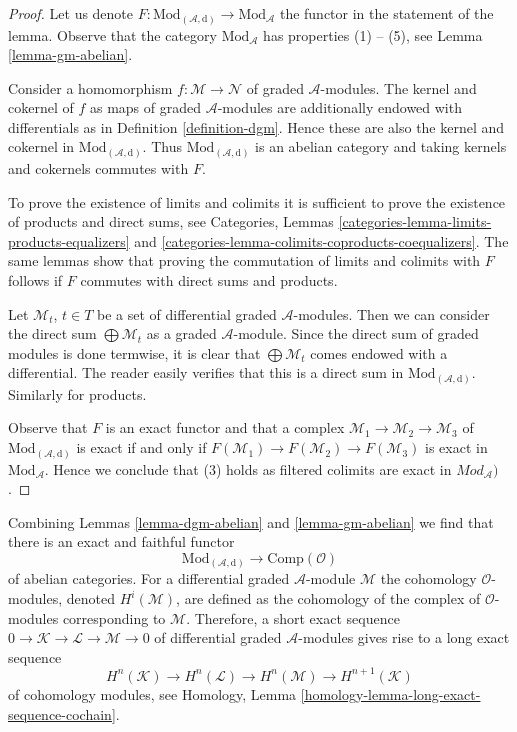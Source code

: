 \begin{proof}
Let us denote
$F : \text{Mod}_{(\mathcal{A}, \text{d})} \to \text{Mod}_\mathcal{A}$
the functor in the statement of the lemma. Observe that
the category $\text{Mod}_\mathcal{A}$ has properties (1) -- (5), see
Lemma \ref{lemma-gm-abelian}.

\medskip\noindent
Consider a homomorphism $f : \mathcal{M} \to \mathcal{N}$
of graded $\mathcal{A}$-modules. The kernel
and cokernel of $f$ as maps of graded $\mathcal{A}$-modules
are additionally endowed with differentials as in
Definition \ref{definition-dgm}. Hence these are also
the kernel and cokernel in $\text{Mod}_{(\mathcal{A}, \text{d})}$.
Thus $\text{Mod}_{(\mathcal{A}, \text{d})}$ is an abelian category
and taking kernels and cokernels commutes with $F$.

\medskip\noindent
To prove the existence of limits and colimits it is sufficient
to prove the existence of products and direct sums, see
Categories, Lemmas \ref{categories-lemma-limits-products-equalizers} and
\ref{categories-lemma-colimits-coproducts-coequalizers}.
The same lemmas show that
proving the commutation of limits and colimits with $F$
follows if $F$ commutes with direct sums and products.

\medskip\noindent
Let $\mathcal{M}_t$, $t \in T$ be a set of differential
graded $\mathcal{A}$-modules. Then we can consider the direct
sum $\bigoplus \mathcal{M}_t$ as a graded $\mathcal{A}$-module.
Since the direct sum of graded modules is done termwise, it is
clear that $\bigoplus \mathcal{M}_t$ comes endowed with a differential.
The reader easily verifies that this is a direct sum in
$\text{Mod}_{(\mathcal{A}, \text{d})}$. Similarly for products.

\medskip\noindent
Observe that $F$ is an exact functor and that
a complex $\mathcal{M}_1 \to \mathcal{M}_2 \to \mathcal{M}_3$
of $\text{Mod}_{(\mathcal{A}, \text{d})}$ is exact if and only if
$F(\mathcal{M}_1) \to F(\mathcal{M}_2) \to F(\mathcal{M}_3)$
is exact in $\text{Mod}_\mathcal{A}$. Hence we conclude that (3)
holds as filtered colimits are exact in
$\textit{Mod}_\mathcal{A})$.
\end{proof}

\noindent
Combining Lemmas \ref{lemma-dgm-abelian} and \ref{lemma-gm-abelian}
we find that there is an exact and faithful functor
$$
\text{Mod}_{(\mathcal{A}, \text{d})} \longrightarrow \text{Comp}(\mathcal{O})
$$
of abelian categories. For a differential graded $\mathcal{A}$-module
$\mathcal{M}$ the cohomology $\mathcal{O}$-modules, denoted $H^i(\mathcal{M})$,
are defined as the cohomology of the complex of
$\mathcal{O}$-modules corresponding to $\mathcal{M}$.
Therefore, a short exact sequence 
$0 \to \mathcal{K} \to \mathcal{L} \to \mathcal{M} \to 0$
of differential graded $\mathcal{A}$-modules
gives rise to a long exact sequence
\begin{equation}
\label{equation-les}
H^n(\mathcal{K}) \to H^n(\mathcal{L}) \to H^n(\mathcal{M}) \to
H^{n + 1}(\mathcal{K})
\end{equation}
of cohomology modules, see
Homology, Lemma \ref{homology-lemma-long-exact-sequence-cochain}.

